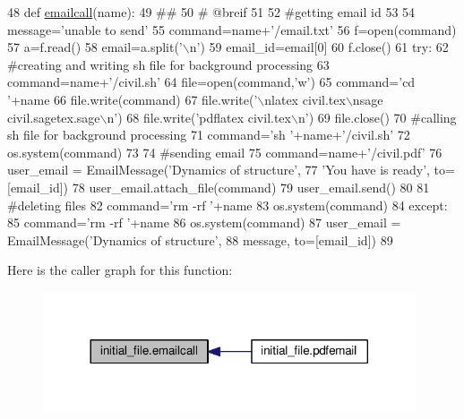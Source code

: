 \begin{DoxyCode}
48 \textcolor{keyword}{def }\hyperlink{namespaceinitial__file_ad9d26ace18fc618ee70df3c0c94927b7}{emailcall}(name):
49     \textcolor{comment}{##}
50     \textcolor{comment}{# @breif }
51     
52     \textcolor{comment}{#getting email id}
53     
54     message=\textcolor{stringliteral}{'unable to send'}
55     command=name+\textcolor{stringliteral}{'/email.txt'}
56     f=open(command)
57     a=f.read()
58         email=a.split(\textcolor{stringliteral}{'\(\backslash\)n'})
59         email\_id=email[0]
60     f.close()
61     \textcolor{keywordflow}{try}:
62         \textcolor{comment}{#creating and writing sh file for background processing}
63         command=name+\textcolor{stringliteral}{'/civil.sh'}
64         file=open(command,\textcolor{stringliteral}{'w'})
65         command=\textcolor{stringliteral}{'cd '}+name
66         file.write(command)
67         file.write(\textcolor{stringliteral}{'\(\backslash\)nlatex civil.tex\(\backslash\)nsage civil.sagetex.sage\(\backslash\)n'})
68         file.write(\textcolor{stringliteral}{'pdflatex civil.tex\(\backslash\)n'})
69         file.close()
70         \textcolor{comment}{#calling sh file for background processing}
71         command=\textcolor{stringliteral}{'sh '}+name+\textcolor{stringliteral}{'/civil.sh'}
72         os.system(command)
73 
74         \textcolor{comment}{#sending email}
75         command=name+\textcolor{stringliteral}{'/civil.pdf'}
76         user\_email = EmailMessage(\textcolor{stringliteral}{'Dynamics of structure'},
77         \textcolor{stringliteral}{'You have is ready'}, to=[email\_id])
78         user\_email.attach\_file(command)
79         user\_email.send()
80 
81         \textcolor{comment}{#deleting files}
82         command=\textcolor{stringliteral}{'rm -rf '}+name
83         os.system(command)
84     \textcolor{keywordflow}{except}:
85                 command=\textcolor{stringliteral}{'rm -rf '}+name
86                 os.system(command)
87         user\_email = EmailMessage(\textcolor{stringliteral}{'Dynamics of structure'},
88         message, to=[email\_id])
89 
\end{DoxyCode}


Here is the caller graph for this function\+:
\nopagebreak
\begin{figure}[H]
\begin{center}
\leavevmode
\includegraphics[width=312pt]{namespaceinitial__file_ad9d26ace18fc618ee70df3c0c94927b7_icgraph}
\end{center}
\end{figure}


